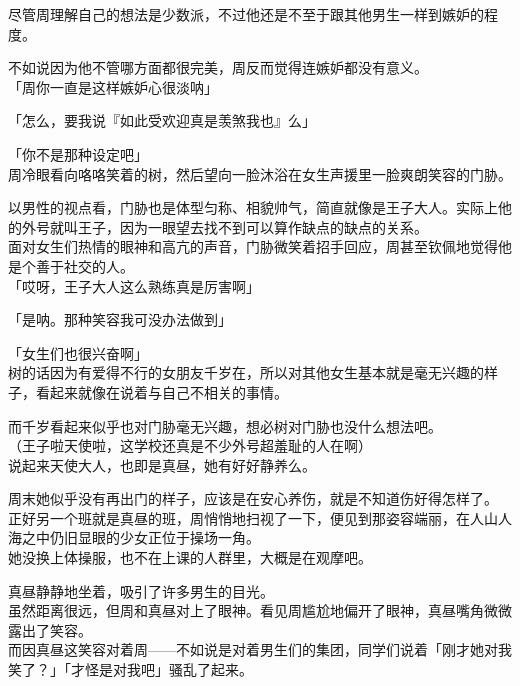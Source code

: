 尽管周理解自己的想法是少数派，不过他还是不至于跟其他男生一样到嫉妒的程度。

不如说因为他不管哪方面都很完美，周反而觉得连嫉妒都没有意义。\\

「周你一直是这样嫉妒心很淡呐」

「怎么，要我说『如此受欢迎真是羡煞我也』么」

「你不是那种设定吧」\\

周冷眼看向咯咯笑着的树，然后望向一脸沐浴在女生声援里一脸爽朗笑容的门胁。

以男性的视点看，门胁也是体型匀称、相貌帅气，简直就像是王子大人。实际上他的外号就叫王子，因为一眼望去找不到可以算作缺点的缺点的关系。\\

面对女生们热情的眼神和高亢的声音，门胁微笑着招手回应，周甚至钦佩地觉得他是个善于社交的人。\\

「哎呀，王子大人这么熟练真是厉害啊」

「是呐。那种笑容我可没办法做到」

「女生们也很兴奋啊」\\

树的话因为有爱得不行的女朋友千岁在，所以对其他女生基本就是毫无兴趣的样子，看起来就像在说着与自己不相关的事情。

而千岁看起来似乎也对门胁毫无兴趣，想必树对门胁也没什么想法吧。\\

（王子啦天使啦，这学校还真是不少外号超羞耻的人在啊）\\

说起来天使大人，也即是真昼，她有好好静养么。

周末她似乎没有再出门的样子，应该是在安心养伤，就是不知道伤好得怎样了。\\

正好另一个班就是真昼的班，周悄悄地扫视了一下，便见到那姿容端丽，在人山人海之中仍旧显眼的少女正位于操场一角。\\

她没换上体操服，也不在上课的人群里，大概是在观摩吧。

真昼静静地坐着，吸引了许多男生的目光。\\

虽然距离很远，但周和真昼对上了眼神。看见周尴尬地偏开了眼神，真昼嘴角微微露出了笑容。\\

而因真昼这笑容对着周——不如说是对着男生们的集团，同学们说着「刚才她对我笑了？」「才怪是对我吧」骚乱了起来。\\

